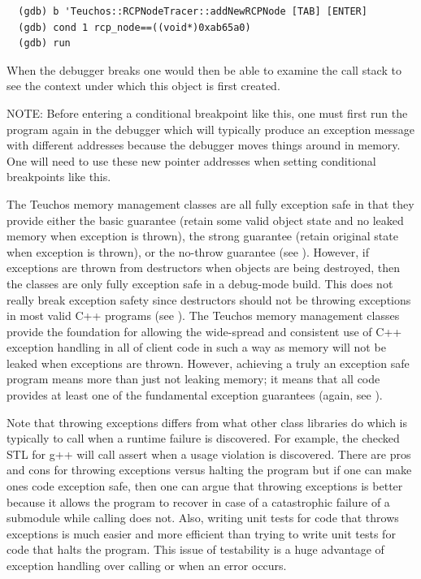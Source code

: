 \documentclass[pdf,ps2pdf,11pt]{SANDreport}
\begin{document}
{\small\begin{verbatim}
  (gdb) b 'Teuchos::RCPNodeTracer::addNewRCPNode [TAB] [ENTER]
  (gdb) cond 1 rcp_node==((void*)0xab65a0)
  (gdb) run
\end{verbatim}}

When the debugger breaks one would then be able to examine the call
stack to see the context under which this {} object is
first created.

NOTE: Before entering a conditional breakpoint like this, one must
first run the program again in the debugger which will typically
produce an exception message with different addresses because the
debugger moves things around in memory.  One will need to use these
new pointer addresses when setting conditional breakpoints like this.

The Teuchos memory management classes are all fully exception safe in
that they provide either the basic guarantee (retain some valid object
state and no leaked memory when exception is thrown), the strong
guarantee (retain original state when exception is thrown), or the
no-throw guarantee (see {}\cite[Item 71]{C++CodingStandards05}).
However, if exceptions are thrown from destructors when objects are
being destroyed, then the classes are only fully exception safe in a
debug-mode build.  This does not really break exception safety since
destructors should not be throwing exceptions in most valid C++
programs (see {}\cite[Item 51]{C++CodingStandards05}).  The Teuchos
memory management classes provide the foundation for allowing the
wide-spread and consistent use of C++ exception handling in all of
client code in such a way as memory will not be leaked when exceptions
are thrown.  However, achieving a truly an exception safe program
means more than just not leaking memory; it means that all code
provides at least one of the fundamental exception guarantees (again,
see {}\cite[Item 71]{C++CodingStandards05}).

Note that throwing exceptions differs from what other class libraries
do which is typically to call {} when a runtime
failure is discovered.  For example, the checked STL for g++ will call
assert when a usage violation is discovered.  There are pros and cons
for throwing exceptions versus halting the program but if one can make
ones code exception safe, then one can argue that throwing exceptions
is better because it allows the program to recover in case of a
catastrophic failure of a submodule while calling {} 
does not.  Also, writing unit tests for code that throws exceptions is
much easier and more efficient than trying to write unit tests for
code that halts the program.  This issue of testability is a huge
advantage of exception handling over calling {} or
{} when an error occurs.
\end{document}
